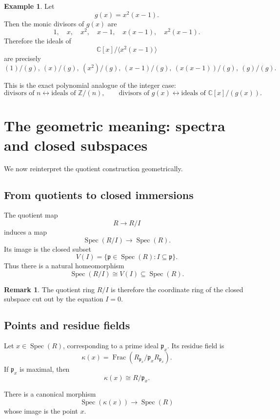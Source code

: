 \documentclass[11pt]{article}
\theoremstyle{definition}
\newtheorem{example}[theorem]{Example}
\newtheorem{remark}[theorem]{Remark}
\newcommand{\Z}{\mathbb{Z}}
\newcommand{\C}{\mathbb{C}}
\newcommand{\Spec}{\operatorname{Spec}}
\newcommand{\Frac}{\operatorname{Frac}}
\newcommand{\kk}[1]{\kappa\!\left(#1\right)}
\newcommand{\ideal}[1]{\langle #1\rangle}
\begin{document}
	\begin{example}
		Let
		\[
		g(x)=x^2(x-1).
		\]
		Then the monic divisors of \(g(x)\) are
		\[
		1,\quad x,\quad x^2,\quad x-1,\quad x(x-1),\quad x^2(x-1).
		\]
		Therefore the ideals of
		\[
		\C[x]/\ideal{x^2(x-1)}
		\]
		are precisely
		\[
		(1)/(g),\ (x)/(g),\ (x^2)/(g),\ (x-1)/(g),\ (x(x-1))/(g),\ (g)/(g).
		\]
	\end{example}
	
	This is the exact polynomial analogue of the integer case:
	\[
	\boxed{
		\text{divisors of }n
		\longleftrightarrow
		\text{ideals of }\Z/(n),
		\qquad
		\text{divisors of }g(x)
		\longleftrightarrow
		\text{ideals of }\C[x]/(g(x)).
	}
	\]
	
	\section{The geometric meaning: spectra and closed subspaces}
	
	We now reinterpret the quotient construction geometrically.
	
	\subsection{From quotients to closed immersions}
	
	The quotient map
	\[
	R\to R/I
	\]
	induces a map
	\[
	\Spec(R/I)\to \Spec(R).
	\]
	Its image is the closed subset
	\[
	V(I)=\{\mathfrak p\in \Spec(R): I\subseteq \mathfrak p\}.
	\]
	Thus there is a natural homeomorphism
	\[
	\Spec(R/I)\cong V(I)\subseteq \Spec(R).
	\]
	
	\begin{remark}
		The quotient ring \(R/I\) is therefore the coordinate ring of the closed subspace cut out by the equation \(I=0\).
	\end{remark}
	
	\subsection{Points and residue fields}
	
	Let \(x\in \Spec(R)\), corresponding to a prime ideal \(\mathfrak p_x\). Its residue field is
	\[
	\kk{x} = \Frac(R_{\mathfrak p_x}/\mathfrak p_xR_{\mathfrak p_x}).
	\]
	If \(\mathfrak p_x\) is maximal, then
	\[
	\kk{x}\cong R/\mathfrak p_x.
	\]
	
	There is a canonical morphism
	\[
	\Spec(\kk{x})\to \Spec(R)
	\]
	whose image is the point \(x\).
	
\end{document}

